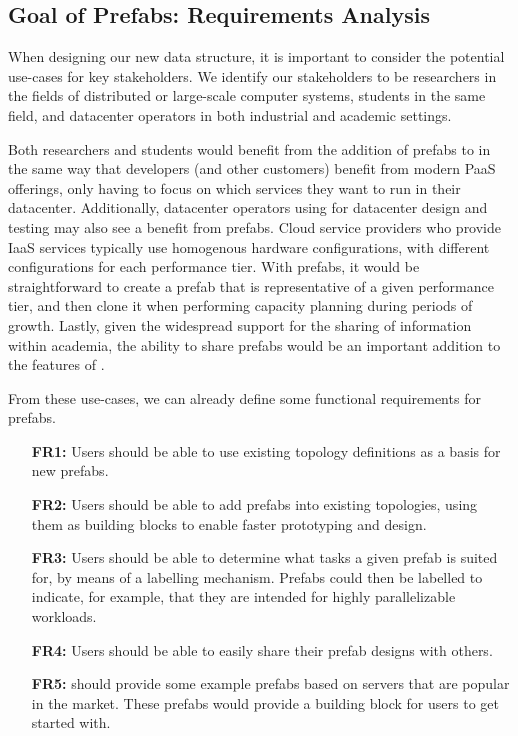 \documentclass[11pt]{article}
\begin{document}
	\subsection{Goal of Prefabs: Requirements Analysis}
		When designing our new data structure, it is important to consider the potential use-cases for key stakeholders.
		We identify our stakeholders to be researchers in the fields of distributed or large-scale computer systems, students in the same field, and datacenter operators in both industrial and academic settings.

		Both researchers and students would benefit from the addition of prefabs to \opendc{} in the same way that developers (and other customers) benefit from modern PaaS offerings, only having to focus on which services they want to run in their datacenter.
		Additionally, datacenter operators using \opendc{} for datacenter design and testing may also see a benefit from prefabs. 
		Cloud service providers who provide IaaS services typically use homogenous hardware configurations, with different configurations for each performance tier. 
		With prefabs, it would be straightforward to create a prefab that is representative of a given performance tier, and then clone it when performing capacity planning during periods of growth.
		Lastly, given the widespread support for the sharing of information within academia, the ability to share prefabs would be an important addition to the features of \opendc{}.

		From these use-cases, we can already define some functional requirements for prefabs.
		\begin{itemize}
			\item [\textbf{FR1:}] Users should be able to use existing topology definitions as a basis for new prefabs.
			\item [\textbf{FR2:}] Users should be able to add prefabs into existing topologies, using them as building blocks to enable faster prototyping and design.
			\item [\textbf{FR3:}] Users should be able to determine what tasks a given prefab is suited for, by means of a labelling mechanism. Prefabs could then be labelled to indicate, for example, that they are intended for highly parallelizable workloads.
			\item [\textbf{FR4:}] Users should be able to easily share their prefab designs with others.
			\item [\textbf{FR5:}] \opendc{} should provide some example prefabs based on servers that are popular in the market. These prefabs would provide a building block for users to get started with.
		\end{itemize}
\end{document}
